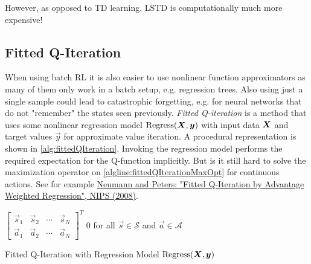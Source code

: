 			However, as opposed to TD learning, LSTD is computationally much more expensive!

		\subsection{Fitted Q-Iteration}
			When using batch RL it is also easier to use nonlinear function approximators as many of them only work in a batch setup, e.g. regression trees. Also using just a single sample could lead to catastrophic forgetting, e.g. for neural networks that do not "remember" the states seen previously. \emph{Fitted Q-iteration} is a method that uses some nonlinear regression model \( \mathrm{Regress}(\bm{X}, \bm{y}) \) with input data \(\bm{X}\) and target values \(\vec{y}\) for approximate value iteration. A procedural representation is shown in \autoref{alg:fittedQIteration}. Invoking the regression model performs the required expectation for the Q-function implicitly. But is it still hard to solve the maximization operator on \autoref{algline:fittedQIterationMaxOpt} for continuous actions. See for example \href{https://proceedings.neurips.cc/paper/2008/hash/f79921bbae40a577928b76d2fc3edc2a-Abstract.html}{Neumann and Peters: "Fitted Q-Iteration by Advantage Weighted Regression", NIPS (2008)}.

			\begin{algorithm}  \DontPrintSemicolon
				 \(
					\begin{bmatrix}
						\vec{s}_1 & \vec{s}_2 & \cdots & \vec{s}_N \\
						\vec{a}_1 & \vec{a}_2 & \cdots & \vec{a}_N
					\end{bmatrix}^T
				\) \;
				 \( 0 \) for all \( \vec{s} \in \mathcal{S} \) and \( \vec{a} \in \mathcal{A} \) \;

				\caption{Fitted Q-Iteration with Regression Model \texorpdfstring{\( \mathrm{Regress}(\bm{X}, \bm{y}) \)}{Regress(X, y)}}
				\label{alg:fittedQIteration}
			\end{algorithm}

